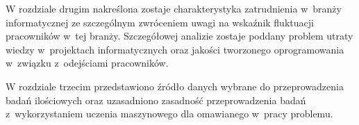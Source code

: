 W rozdziale drugim nakreślona zostaje charakterystyka zatrudnienia w~branży informatycznej ze szczególnym zwróceniem uwagi na wskaźnik fluktuacji pracowników w~tej branży.
Szczegółowej analizie zostaje poddany problem utraty wiedzy w~projektach informatycznych oraz jakości tworzonego oprogramowania w~związku z~odejściami pracowników.

W rozdziale trzecim przedstawiono źródło danych wybrane do przeprowadzenia badań ilościowych
oraz uzasadniono zasadność przeprowadzenia badań z~wykorzystaniem uczenia maszynowego dla omawianego w~pracy problemu.

\thispagestyle{normal}

